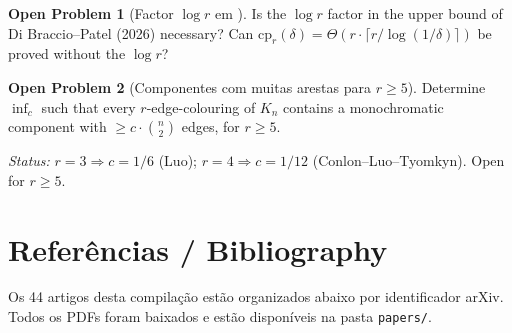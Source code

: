 \documentclass[12pt,a4paper,twoside,openright]{book}
\theoremstyle{definition}
\newtheorem{problem}{Open Problem}[chapter]
\begin{document}
\begin{problem}[Factor $\log r$ em ]
Is the $\log r$ factor in the upper bound of Di Braccio--Patel (2026) necessary?
Can $\mathrm{cp}_r(\delta) = \Theta\!\left(r \cdot \lceil r/\log(1/\delta)\rceil\right)$ be proved without the $\log r$?
\end{problem}

\begin{problem}[Componentes com muitas arestas para $r \geq 5$]
Determine $\inf_c$ such that every $r$-edge-colouring of $K_n$ contains a monochromatic component
with $\geq c \cdot \binom{n}{2}$ edges, for $r \geq 5$.

\medskip\noindent
\textit{Status:} $r=3 \Rightarrow c=1/6$ (Luo); $r=4 \Rightarrow c=1/12$ (Conlon--Luo--Tyomkyn). Open for $r \geq 5$.
\end{problem}

\chapter*{Referências / Bibliography}


\noindent Os 44 artigos desta compilação estão organizados abaixo por identificador arXiv.
Todos os PDFs foram baixados e estão disponíveis na pasta \texttt{papers/}.
\end{document}
